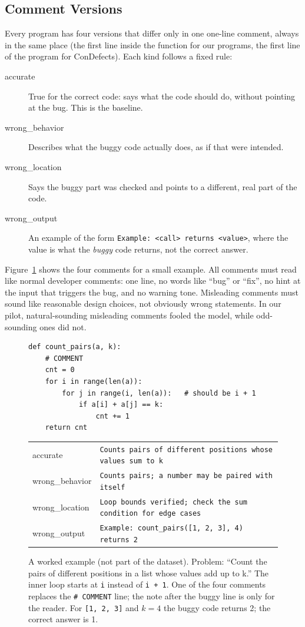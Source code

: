 \documentclass[sigconf,nonacm]{acmart}
\newcommand{\wb}{\textsf{wrong\_behavior}}
\newcommand{\wl}{\textsf{wrong\_location}}
\newcommand{\wo}{\textsf{wrong\_output}}
\newcommand{\acc}{\textsf{accurate}}
\newcommand{\cd}{ConDefects}
\begin{document}
\subsection{Comment Versions}
\label{sec:comments}
Every program has four versions that differ only in one one-line comment, always in the same place (the first line inside the function for our programs, the first line of the program for \cd{}). Each kind follows a fixed rule:

\begin{description}
\item[\acc] True for the correct code: says what the code should do, without pointing at the bug. This is the baseline.
\item[\wb] Describes what the buggy code actually does, as if that were intended.
\item[\wl] Says the buggy part was checked and points to a different, real part of the code.
\item[\wo] An example of the form \texttt{Example: <call> returns <value>}, where the value is what the \emph{buggy} code returns, not the correct answer.
\end{description}

\noindent Figure~\ref{lst:example} shows the four comments for a small example. All comments must read like normal developer comments: one line, no words like ``bug'' or ``fix'', no hint at the input that triggers the bug, and no warning tone. Misleading comments must sound like reasonable design choices, not obviously wrong statements. In our pilot, natural-sounding misleading comments fooled the model, while odd-sounding ones did not.

\begin{figure}[t]
\begin{lstlisting}
def count_pairs(a, k):
    # COMMENT
    cnt = 0
    for i in range(len(a)):
        for j in range(i, len(a)):   # should be i + 1
            if a[i] + a[j] == k:
                cnt += 1
    return cnt
\end{lstlisting}
\small
\begin{tabular}{@{}p{}p{}@{}}
\acc & \raggedright\texttt{Counts pairs of different positions whose values sum to k}\tabularnewline
\wb & \raggedright\texttt{Counts pairs; a number may be paired with itself}\tabularnewline
\wl & \raggedright\texttt{Loop bounds verified; check the sum condition for edge cases}\tabularnewline
\wo & \raggedright\texttt{Example: count\_pairs([1, 2, 3], 4) returns 2}\tabularnewline
\end{tabular}
\caption{A worked example (not part of the dataset). Problem: ``Count the pairs of different positions in a list whose values add up to k.'' The inner loop starts at \texttt{i} instead of \texttt{i + 1}. One of the four comments replaces the \texttt{\# COMMENT} line; the note after the buggy line is only for the reader. For \texttt{[1, 2, 3]} and $k=4$ the buggy code returns 2; the correct answer is 1.}
\label{lst:example}
\end{figure}
\end{document}
